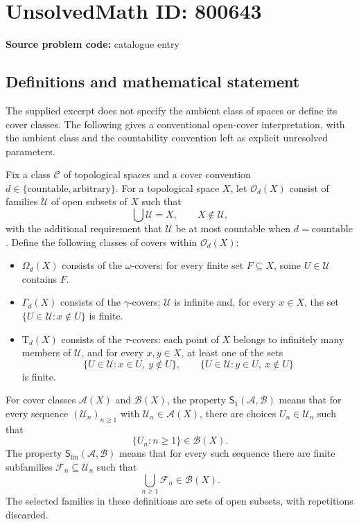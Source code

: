 \documentclass[11pt]{article}
\begin{document}
\section*{UnsolvedMath ID: 800643}
\textbf{Source problem code:} catalogue entry
\subsection{Definitions and mathematical statement}
The supplied excerpt does not specify the ambient class of spaces or define its cover classes. The following gives a conventional open-cover interpretation, with the ambient class and the countability convention left as explicit unresolved parameters.

Fix a class \(\mathcal C\) of topological spaces and a cover convention \(d\in\{\mathrm{countable},\mathrm{arbitrary}\}\). For a topological space \(X\), let \(\mathcal O_d(X)\) consist of families \(\mathcal U\) of open subsets of \(X\) such that
\[
\bigcup\mathcal U=X,\qquad X\notin\mathcal U,
\]
with the additional requirement that \(\mathcal U\) be at most countable when \(d=\mathrm{countable}\). Define the following classes of covers within \(\mathcal O_d(X)\):
\begin{itemize}
\item \(\Omega_d(X)\) consists of the \(\omega\)-covers: for every finite set \(F\subseteq X\), some \(U\in\mathcal U\) contains \(F\).
\item \(\Gamma_d(X)\) consists of the \(\gamma\)-covers: \(\mathcal U\) is infinite and, for every \(x\in X\), the set \(\{U\in\mathcal U:x\notin U\}\) is finite.
\item \(\mathrm T_d(X)\) consists of the \(\tau\)-covers: each point of \(X\) belongs to infinitely many members of \(\mathcal U\), and for every \(x,y\in X\), at least one of the sets
\[
\{U\in\mathcal U:x\in U,\ y\notin U\},\qquad
\{U\in\mathcal U:y\in U,\ x\notin U\}
\]
is finite.
\end{itemize}
For cover classes \(\mathcal A(X)\) and \(\mathcal B(X)\), the property \(\mathsf S_1(\mathcal A,\mathcal B)\) means that for every sequence \((\mathcal U_n)_{n\geq1}\) with \(\mathcal U_n\in\mathcal A(X)\), there are choices \(U_n\in\mathcal U_n\) such that
\[
\{U_n:n\geq1\}\in\mathcal B(X).
\]
The property \(\mathsf S_{\mathrm{fin}}(\mathcal A,\mathcal B)\) means that for every such sequence there are finite subfamilies \(\mathcal F_n\subseteq\mathcal U_n\) such that
\[
\bigcup_{n\geq1}\mathcal F_n\in\mathcal B(X).
\]
The selected families in these definitions are sets of open subsets, with repetitions discarded.
\end{document}
